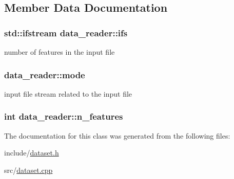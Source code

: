 \subsection{Member Data Documentation}
\hypertarget{classdata__reader_a1a39328bde93e7f132a1ca7eb6642311}{
\subsubsection[{ifs}]{\setlength{\rightskip}{0pt plus 5cm}std\+::ifstream data\+\_\+reader\+::ifs\hspace{0.3cm}{\ttfamily [private]}}}\label{classdata__reader_a1a39328bde93e7f132a1ca7eb6642311}
number of features in the input file \hypertarget{classdata__reader_a4132a7abcf03cca64e2eb204e70fffd3}{
\subsubsection[{mode}]{ data\+\_\+reader\+::mode\hspace{0.3cm}{\ttfamily [private]}}}\label{classdata__reader_a4132a7abcf03cca64e2eb204e70fffd3}
input file stream related to the input file \hypertarget{classdata__reader_ab77f1bebd79be09216119e127b463434}{
\subsubsection[{n\+\_\+features}]{\setlength{\rightskip}{0pt plus 5cm}int data\+\_\+reader\+::n\+\_\+features\hspace{0.3cm}{\ttfamily [private]}}}\label{classdata__reader_ab77f1bebd79be09216119e127b463434}


The documentation for this class was generated from the following files\+:\begin{DoxyCompactItemize}
\item 
include/\hyperlink{dataset_8h}{dataset.\+h}\item 
src/\hyperlink{dataset_8cpp}{dataset.\+cpp}\end{DoxyCompactItemize}
